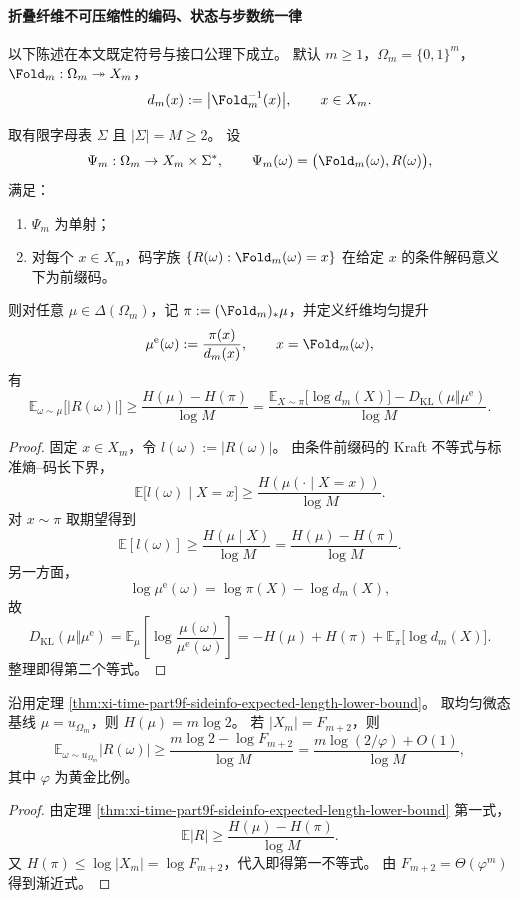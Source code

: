 \paragraph{折叠纤维不可压缩性的编码、状态与步数统一律}
以下陈述在本文既定符号与接口公理下成立。
默认 \(m\ge 1\)，\(\Omega_m=\{0,1\}^m\)，\(\Fold_m:\Omega_m\twoheadrightarrow X_m\)，
\[
d_m(x):=\bigl|\Fold_m^{-1}(x)\bigr|,\qquad x\in X_m.
\]

\begin{theorem}[熵账本诱导的侧信息期望码长下界]\label{thm:xi-time-part9f-sideinfo-expected-length-lower-bound}
取有限字母表 \(\Sigma\) 且 \(|\Sigma|=M\ge 2\)。
设
\[
\Psi_m:\Omega_m\to X_m\times\Sigma^{\ast},\qquad
\Psi_m(\omega)=\bigl(\Fold_m(\omega),R(\omega)\bigr),
\]
满足：
\begin{enumerate}
  \item \(\Psi_m\) 为单射；
  \item 对每个 \(x\in X_m\)，码字族
  \(
  \{R(\omega):\Fold_m(\omega)=x\}
  \)
  在给定 \(x\) 的条件解码意义下为前缀码。
\end{enumerate}
则对任意 \(\mu\in\Delta(\Omega_m)\)，记 \(\pi:=(\Fold_m)_{\ast}\mu\)，并定义纤维均匀提升
\[
\mu^{\mathrm e}(\omega):=
\frac{\pi(x)}{d_m(x)},
\qquad x=\Fold_m(\omega),
\]
有
\[
\mathbb E_{\omega\sim\mu}\!\bigl[|R(\omega)|\bigr]
\ge
\frac{H(\mu)-H(\pi)}{\log M}
=
\frac{\mathbb E_{X\sim\pi}\!\bigl[\log d_m(X)\bigr]-D_{\mathrm{KL}}(\mu\Vert\mu^{\mathrm e})}{\log M}.
\]
\end{theorem}
\begin{proof}
固定 \(x\in X_m\)，令 \(l(\omega):=|R(\omega)|\)。
由条件前缀码的 Kraft 不等式与标准熵--码长下界，
\[
\mathbb E\!\bigl[l(\omega)\mid X=x\bigr]
\ge
\frac{H(\mu(\cdot\mid X=x))}{\log M}.
\]
对 \(x\sim\pi\) 取期望得到
\[
\mathbb E[l(\omega)]
\ge
\frac{H(\mu\mid X)}{\log M}
=
\frac{H(\mu)-H(\pi)}{\log M}.
\]
另一方面，
\[
\log\mu^{\mathrm e}(\omega)=\log\pi(X)-\log d_m(X),
\]
故
\[
D_{\mathrm{KL}}(\mu\Vert\mu^{\mathrm e})
=
\mathbb E_{\mu}\!\left[\log\frac{\mu(\omega)}{\mu^{\mathrm e}(\omega)}\right]
=
-H(\mu)+H(\pi)+\mathbb E_{\pi}\!\bigl[\log d_m(X)\bigr].
\]
整理即得第二个等式。
\end{proof}

\begin{corollary}[可逆外置平均码长的线性下界]\label{cor:xi-time-part9f-no-constant-memory}
沿用定理 \ref{thm:xi-time-part9f-sideinfo-expected-length-lower-bound}。
取均匀微态基线 \(\mu=u_{\Omega_m}\)，则 \(H(\mu)=m\log 2\)。
若 \(|X_m|=F_{m+2}\)，则
\[
\mathbb E_{\omega\sim u_{\Omega_m}}|R(\omega)|
\ge
\frac{m\log 2-\log F_{m+2}}{\log M}
=
\frac{m\log(2/\varphi)+O(1)}{\log M},
\]
其中 \(\varphi\) 为黄金比例。
\end{corollary}
\begin{proof}
由定理 \ref{thm:xi-time-part9f-sideinfo-expected-length-lower-bound} 第一式，
\[
\mathbb E|R|
\ge
\frac{H(\mu)-H(\pi)}{\log M}.
\]
又 \(H(\pi)\le \log|X_m|=\log F_{m+2}\)，代入即得第一不等式。
由 \(F_{m+2}=\Theta(\varphi^m)\) 得到渐近式。
\end{proof}

